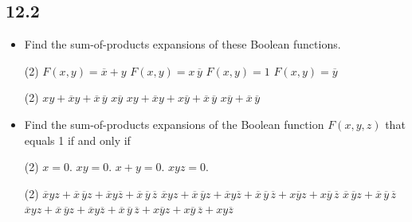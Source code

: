 \subsection{12.2}
\begin{itemize}
    \item[2.]  Find the sum-of-products expansions of these Boolean
          functions.
          \begin{tasks}(2)
              \task $F (x, y) = \overline{x} + y$
              \task $F (x, y) = x\, \overline{y}$
              \task $F (x, y) = 1$
              \task $F (x, y) = \overline{y}$
          \end{tasks}
          \answer
          \begin{tasks}(2)
              \task $xy + \overline{x} y + \overline{x}\,\overline{y}$
              \task $x\overline{y}$
              \task $xy + \overline{x} y + x\overline{y}+\overline{x}\,\overline{y}$
              \task $x\overline{y} + \overline{x}\,\overline{y}$
          \end{tasks}

    \item[4.] Find the sum-of-products expansions of the Boolean
          function $F (x, y, z)$ that equals 1 if and only if
          \begin{tasks}(2)
              \task $x = 0.$
              \task $xy = 0.$
              \task $x + y = 0.$
              \task $xyz = 0.$
          \end{tasks}
          \answer
          \begin{tasks}(2)
              \task $\overline{x}yz + \overline{x}\,\overline{y}z + \overline{x}y\overline{z} + \overline{x}\,\overline{y}\,\overline{z}$
              \task $\overline{x}yz + \overline{x}\,\overline{y}z + \overline{x}y\overline{z} + \overline{x}\,\overline{y}\,\overline{z} + x\overline{y}z + x\overline{y}\,\overline{z}$
              \task $\overline{x}\,\overline{y}z + \overline{x}\,\overline{y}\,\overline{z}$
              \task $\overline{x}yz + \overline{x}\,\overline{y}z + \overline{x}y\overline{z} + \overline{x}\,\overline{y}\,\overline{z} + x\overline{y}z + x\overline{y}\,\overline{z} + xy\overline{z}$
          \end{tasks}


\end{itemize}
